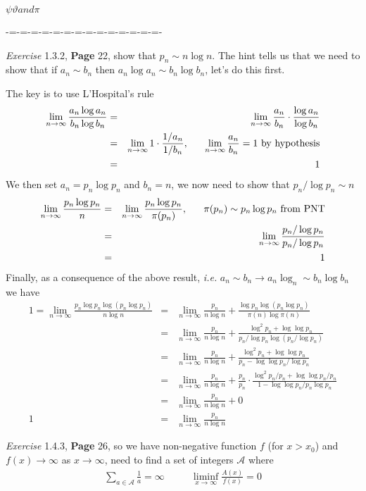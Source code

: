 \documentclass[aps,preprint,preprintnumbers,nofootinbib,showpacs,prd]{revtex4-1}
\newcommand{\ie}{{\it i.e.} }
\newcommand{\nbea}{\begin{eqnarray*}}
\newcommand{\neea}{\end{eqnarray*}}
\begin{document}
$\psi \vartheta and \pi$









-=-=-=-=-=-=-=-=-=-=-=-=-=-=-

{\it Exercise} 1.3.2, {\bf Page} 22, show that $p_n \sim n \log n$. The hint tells us that we need to show that if $a_n \sim b_n$ then $a_n \log a_n \sim b_n \log b_n$, let's do this first.

The key is to use L'Hospital's rule
%
\nbea
\lim_{n\to\infty} \frac{a_n\log a_n}{b_n\log b_n} & = & \lim_{n\to\infty} \frac{a_n}{b_n} \cdot \frac{\log a_n}{\log b_n} \\
& = & \lim_{n\to\infty} 1 \cdot \frac{1/a_n}{1/b_n}, ~~~~~  \lim_{n\to\infty} \frac{a_n}{b_n} = 1 {\rm~by~hypothesis}\\
& = & 1
\neea
%
We then set $a_n = p_n\log p_n$ and $b_n = n$, we now need to show that $p_n/\log p_n \sim n$
%
\nbea
\lim_{n\to\infty}\frac{p_n\log p_n}{n} & = & \lim_{n\to\infty}\frac{p_n\log p_n}{\pi(p_n)}, ~~~~~ \pi(p_n) \sim p_n\log p_n {\rm~from~PNT} \\
& = & \lim_{n\to\infty}\frac{p_n/\log p_n}{p_n/\log p_n} \\
& = & 1
\neea
%
Finally, as a consequence of the above result, \ie $a_n \sim b_n \to a_n\log _n \sim b_n \log b_n$ we have
%
\nbea
1 = \lim_{n\to\infty}\frac{p_n\log p_n\log(p_n\log p_n)}{n\log n} & = & \lim_{n\to\infty}\frac{p_n}{n\log n} + \frac{\log p_n\log(p_n\log p_n)}{\pi(n)\log \pi(n)} \\
& = & \lim_{n\to\infty}\frac{p_n}{n\log n} + \frac{\log^2 p_n + \log \log p_n}{p_n/\log p_n \log (p_n/\log p_n)} \\
& = & \lim_{n\to\infty}\frac{p_n}{n\log n} + \frac{\log^2 p_n + \log \log p_n}{p_n - \log \log p_n/\log p_n} \\
& = & \lim_{n\to\infty}\frac{p_n}{n\log n} + \frac{p_n}{p_n}\cdot\frac{\log^2 p_n/p_n + \log \log p_n/p_n}{1 - \log \log p_n/p_n\log p_n} \\
& = & \lim_{n\to\infty}\frac{p_n}{n\log n} + 0 \\
1 & = & \lim_{n\to\infty}\frac{p_n}{n\log n}
\neea
%

{\it Exercise} 1.4.3, {\bf Page} 26, so we have non-negative function $f$ (for $x > x_0$) and $f(x)\to\infty$ as $x\to\infty$, need to find a set of integers $\mathcal{A}$ where
%
\nbea
\sum_{a\in\mathcal{A}} \frac{1}{a} = \infty ~~~~~~~~~~~~ \liminf_{x\to\infty}\frac{A(x)}{f(x)} = 0
\neea
%
\end{document}

